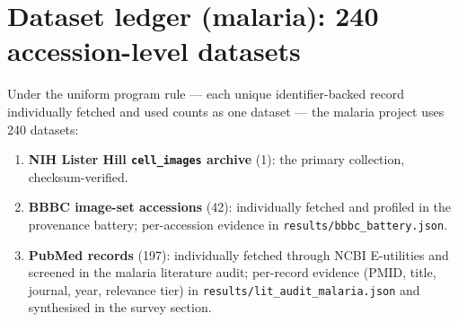 \section{Dataset ledger (malaria): 240 accession-level datasets}
Under the uniform program rule --- each unique identifier-backed record
individually fetched and used counts as one dataset --- the malaria project
uses 240 datasets:
\begin{enumerate}
\item \textbf{NIH Lister Hill \texttt{cell\_images} archive} (1): the
primary collection, checksum-verified.
\item \textbf{BBBC image-set accessions} (42): individually fetched and
profiled in the provenance battery; per-accession evidence in
\texttt{results/bbbc\_battery.json}.
\item \textbf{PubMed records} (197): individually fetched through
NCBI E-utilities and screened in the malaria literature audit;
per-record evidence (PMID, title, journal, year, relevance tier) in
\texttt{results/lit\_audit\_malaria.json} and synthesised in the survey
section.
\end{enumerate}
